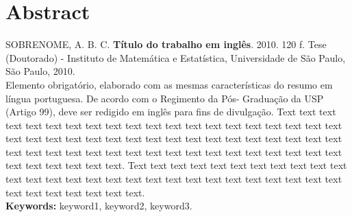\documentclass[11pt,twoside,a4paper]{book}
\begin{document}
\chapter*{Abstract}
\noindent SOBRENOME, A. B. C. \textbf{Título do trabalho em inglês}. 
2010. 120 f.
Tese (Doutorado) - Instituto de Matemática e Estatística,
Universidade de São Paulo, São Paulo, 2010.
\\


Elemento obrigatório, elaborado com as mesmas características do resumo em
língua portuguesa. De acordo com o Regimento da Pós- Graduação da USP (Artigo
99), deve ser redigido em inglês para fins de divulgação. 
Text text text text text text text text text text text text text text text text
text text text text text text text text text text text text text text text text
text text text text text text text text text text text text text text text text
text text text text text text text text text text text text.
Text text text text text text text text text text text text text text text text
text text text text text text text text text text text text text text text text
text text text.
\\

\noindent \textbf{Keywords:} keyword1, keyword2, keyword3.

\tableofcontents    %


\end{document}
